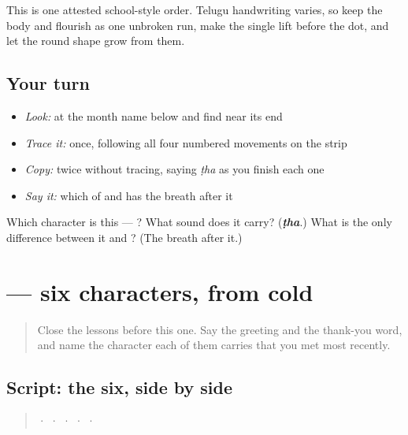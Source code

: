 This is one attested school-style order. Telugu handwriting varies, so keep the body and flourish as one unbroken run, make the single lift before the dot, and let the round shape grow from them.

\subsection*{Your turn}
\begin{itemize}
\raggedright
  \item \emph{Look:} at the month name below and find  near its end
\end{itemize}

\begin{quote}
\end{quote}

\begin{itemize}
\raggedright
  \item \emph{Trace it:}  once, following all four numbered movements on the strip
  \item \emph{Copy:}  twice without tracing, saying \emph{ṭha} as you finish each one
  \item \emph{Say it:} which of  and  has the breath after it
\end{itemize}

\begin{tcolorbox}[breakable,colback=teal!4,colframe=teal!35!black,title={Before you move on}]
Which character is this — ? What sound does it carry? (\emph{\textbf{ṭha}}.) What is the only difference between it and ? (The breath after it.)
\end{tcolorbox}
\section[\texorpdfstring{\te{ఆరు} \te{అక్షరాలు} (āru akṣarālu)}{ఆరు అక్షరాలు (āru akṣarālu)}]{  — six characters, from cold}

\label{lesson:TE-S156-script-recall}



\begin{quote}
Close the lessons before this one. Say the greeting and the thank-you word, and name the character each of them carries that you met most recently.
\end{quote}

\subsection*{Script: the six, side by side}
\begin{quote}
 ·  ·  ·  ·  · 
\end{quote}

